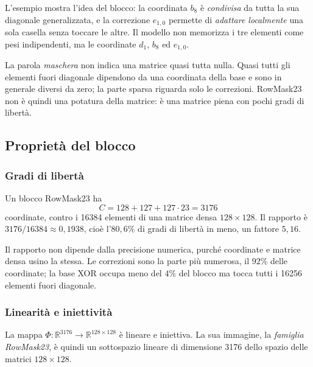 L'esempio mostra l'idea del blocco: la coordinata $b_8$ è \emph{condivisa} da tutta la sua diagonale generalizzata, e la correzione $e_{1,0}$ permette di \emph{adattare localmente} una sola casella senza toccare le altre. Il modello non memorizza i tre elementi come pesi indipendenti, ma le coordinate $d_1$, $b_8$ ed $e_{1,0}$.

\label{sec:non-potatura-rowmask}
La parola \emph{maschera} non indica una matrice quasi tutta nulla. Quasi tutti gli elementi fuori diagonale dipendono da una coordinata della base e sono in generale diversi da zero; la parte sparsa riguarda solo le correzioni. RowMask23 non è quindi una potatura della matrice: è una matrice piena con pochi gradi di libertà.

\subsection{Proprietà del blocco}
\label{sec:linearita-iniettivita}

\subsubsection{Gradi di libertà}

\begin{proposizione}
Un blocco RowMask23 ha
\[
C = 128 + 127 + 127\cdot23 = \num{3176}
\]
coordinate, contro i \num{16384} elementi di una matrice densa $128\times128$. Il rapporto è $\num{3176}/\num{16384}\approx 0{,}1938$, cioè l'$80{,}6\%$ di gradi di libertà in meno, un fattore $5{,}16$.
\end{proposizione}

Il rapporto non dipende dalla precisione numerica, purché coordinate e matrice densa usino la stessa. Le correzioni sono la parte più numerosa, il $92\%$ delle coordinate; la base XOR occupa meno del $4\%$ del blocco ma tocca tutti i \num{16256} elementi fuori diagonale.

\subsubsection{Linearità e iniettività}

\begin{proposizione}
La mappa $\Phi:\mathbb{R}^{3176}\to\mathbb{R}^{128\times128}$ è lineare e iniettiva. La sua immagine, la \emph{famiglia RowMask23}, è quindi un sottospazio lineare di dimensione \num{3176} dello spazio delle matrici $128\times128$.
\end{proposizione}


